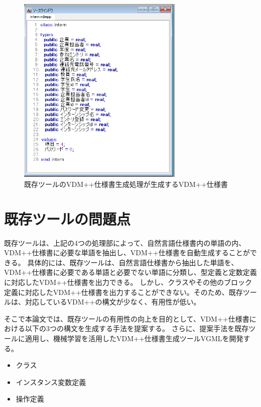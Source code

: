 \begin{figure}[tp]
    \begin{center}
        \includegraphics[width=300]{image/exis_vdm.png}
        \caption{既存ツールのVDM++仕様書生成処理が生成するVDM++仕様書}
        \label{fig:exis_vdm}
    \end{center}
\end{figure}

\section{既存ツールの問題点}
\label{sec:problem}
既存ツールは、上記の4つの処理部によって、自然言語仕様書内の単語の内、VDM++仕様書に必要な単語を抽出し、VDM++仕様書を自動生成することができる。
具体的には、既存ツールは、自然言語仕様書から抽出した単語を、VDM++仕様書に必要である単語と必要でない単語に分類し、型定義と定数定義に対応したVDM++仕様書を出力できる。
しかし、クラスやその他のブロック定義に対応したVDM++仕様書を出力することができない。そのため、既存ツールは、対応しているVDM++の構文が少なく、有用性が低い。

そこで本論文では、既存ツールの有用性の向上を目的として、VDM++仕様書における以下の3つの構文を生成する手法を提案する。
さらに、提案手法を既存ツールに適用し、機械学習を活用したVDM++仕様書生成ツールVGMLを開発する。

\begin{itemize}
    \item クラス
    \item インスタンス変数定義
    \item 操作定義
\end{itemize}